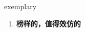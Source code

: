
\begin{frame}
{\huge exemplary}
\begin{center}
\begin{enumerate}\Large
  \item \textbf{榜样的，值得效仿的}
\end{enumerate}
\end{center}
\end{frame}
